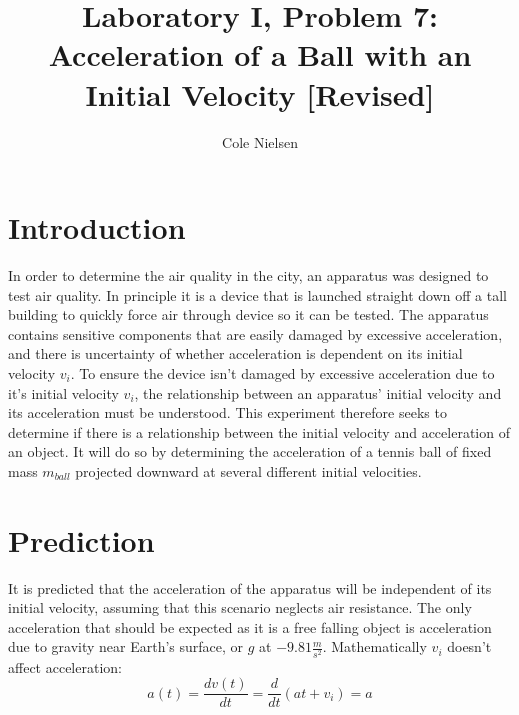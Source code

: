 \documentclass[12pt,letterpaper]{article}
\begin{document}
\title{Laboratory I, Problem 7: Acceleration of a Ball with an Initial Velocity [Revised]}
\author[]{Cole Nielsen}
\date{} %
\pdfpagewidth 8.5in
\pdfpageheight 11in
%
%
\maketitle
%

\section{Introduction}
In order to determine the air quality in the city, an apparatus was designed to test air quality. In principle it is a device that is launched straight down off a tall building to quickly force air through device so it can be tested. The apparatus contains sensitive components that are easily damaged by excessive acceleration, and there is uncertainty of whether acceleration is dependent on its initial velocity \(v_i\). To ensure the device isn't damaged by excessive acceleration due to it's initial velocity \(v_i\), the relationship between an apparatus' initial velocity and its acceleration must be understood. This experiment therefore seeks to determine if there is a relationship between the initial velocity and acceleration of an object. It will do so by determining the acceleration of a tennis ball of fixed mass \(m_{ball}\) projected downward at several different initial velocities.
\section{Prediction}
It is predicted that the acceleration of the apparatus will be independent of its initial velocity, assuming that this scenario neglects air resistance. The only acceleration that should be expected as it is a free falling object is acceleration due to gravity near Earth's surface, or \(g\) at \(-9.81 \frac{m}{s^2}\). Mathematically \(v_i\) doesn't affect acceleration:
\begin{equation}
a(t) = \frac{dv(t)}{dt} = \frac{d}{dt}(at+v_i) = a
\end{equation}
\pagebreak
\end{document}
